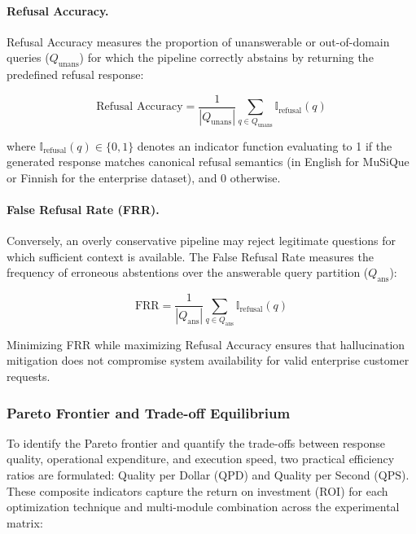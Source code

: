 \paragraph{Refusal Accuracy.} Refusal Accuracy measures the proportion of unanswerable or out-of-domain queries ($Q_{\text{unans}}$) for which the pipeline correctly abstains by returning the predefined refusal response:

\begin{equation}
\label{eq:refusal_accuracy}
\text{Refusal Accuracy} = \frac{1}{|Q_{\text{unans}}|} \sum_{q \in Q_{\text{unans}}} \mathbb{I}_{\text{refusal}}(q)
\end{equation}

where $\mathbb{I}_{\text{refusal}}(q) \in \{0, 1\}$ denotes an indicator function evaluating to 1 if the generated response matches canonical refusal semantics (in English for MuSiQue or Finnish for the enterprise dataset), and 0 otherwise.

\paragraph{False Refusal Rate (FRR).} Conversely, an overly conservative pipeline may reject legitimate questions for which sufficient context is available. The False Refusal Rate measures the frequency of erroneous abstentions over the answerable query partition ($Q_{\text{ans}}$):

\begin{equation}
\label{eq:false_refusal_rate}
\text{FRR} = \frac{1}{|Q_{\text{ans}}|} \sum_{q \in Q_{\text{ans}}} \mathbb{I}_{\text{refusal}}(q)
\end{equation}

Minimizing FRR while maximizing Refusal Accuracy ensures that hallucination mitigation does not compromise system availability for valid enterprise customer requests.

\subsubsection{Pareto Frontier and Trade-off Equilibrium}
\label{sec:pareto}

To identify the Pareto frontier and quantify the trade-offs between response quality, operational expenditure, and execution speed, two practical efficiency ratios are formulated: Quality per Dollar ($\text{QPD}$) and Quality per Second ($\text{QPS}$). These composite indicators capture the return on investment (ROI) for each optimization technique and multi-module combination across the experimental matrix:


